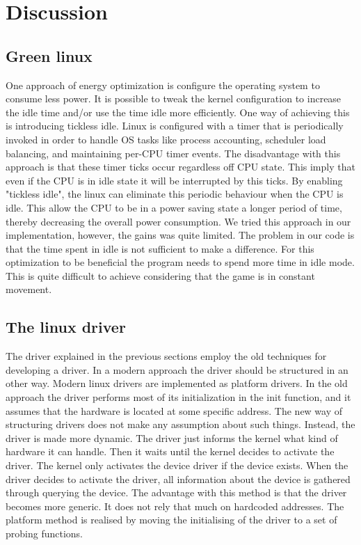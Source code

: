 \section{Discussion}

\subsection{Green linux}
One approach of energy optimization is configure the operating system to consume less power. It is possible to tweak the kernel configuration to increase the idle time and/or use the time idle more efficiently. One way of achieving this is introducing tickless idle. Linux is configured with a timer that is periodically invoked in order to handle OS tasks like process accounting, scheduler load balancing, and maintaining per-CPU timer events. The disadvantage with this approach is that these timer ticks occur regardless off CPU state. This imply that even if the CPU is in idle state it will be interrupted by this ticks. By enabling "tickless idle", the linux can eliminate this periodic behaviour when the CPU is idle. This allow the CPU to be in a power saving state a longer period of time, thereby decreasing the overall power consumption\cite{tick}. We tried this approach in our implementation, however, the gains was quite limited. The problem in our code is that the time spent in idle is not sufficient to make a difference. For this optimization to be beneficial the program needs to spend more time in idle mode. This is quite difficult to achieve considering that the game is in constant movement. 



\subsection{The linux driver}
The driver explained in the previous sections employ the old techniques for developing a driver. In a modern approach the driver should be structured in an other way. Modern linux drivers are implemented as platform drivers. In the old approach the driver performs most of its initialization in the init function, and it assumes that the hardware is located at some specific address. The new way of structuring drivers does not make any assumption about such things. Instead, the driver is made more dynamic. The driver just informs the kernel what kind of hardware it can handle. Then it waits until the kernel decides to activate the driver. The kernel only activates the device driver if the device exists. When the driver decides to activate the driver, all information about the device is gathered through querying the device. The advantage with this method is that the driver becomes more generic. It does not rely that much on hardcoded addresses. The platform method is realised by moving the initialising  of the driver to a set of probing functions. 

